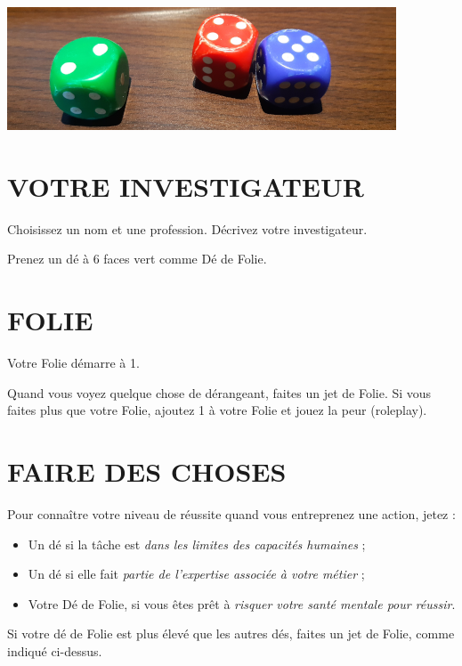 \documentclass[11pt]{article}
\begin{document}
\newpage
\pagestyle{fancy}

\begin{center}
\includegraphics[scale=0.6]{des-petit}
\end{center}

\section{VOTRE INVESTIGATEUR}

Choisissez un nom et une profession. Décrivez votre investigateur.

Prenez un dé à 6 faces vert comme Dé de Folie.

\section{FOLIE}

Votre Folie démarre à 1.

Quand vous voyez quelque chose de dérangeant, faites un jet de Folie. Si vous faites plus que votre Folie, ajoutez 1 à votre Folie et jouez la peur (roleplay).

\section{FAIRE DES CHOSES}

Pour connaître votre niveau de réussite quand vous entreprenez une action, jetez :

\begin{itemize}
\item Un dé si la tâche est \textit{dans les limites des capacités humaines} ;
\item Un dé si elle fait \textit{partie de l'expertise associée à votre métier} ;
\item Votre Dé de Folie, si vous êtes prêt à \textit{risquer votre santé mentale pour réussir}.
\end{itemize}

Si votre dé de Folie est plus élevé que les autres dés, faites un jet de Folie, comme indiqué ci-dessus.
\end{document}
